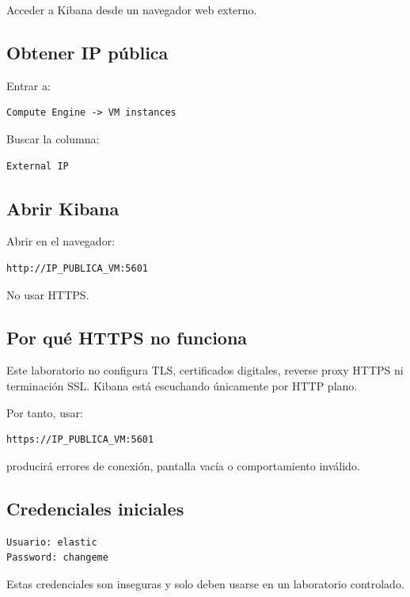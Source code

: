 \documentclass[
  coursetitle={Cómputo Nube y Tecnologías Emergentes},
  coursehours={96},
  coursedate={Verano 2026},
  doctype={Laboratorio},
  otherlangs={english,french},
  authorname={Lázaro},
  authorsurname={Bustio-Martínez},
  authortitle={PhD},
  role={Profesor Investigador},
  email={lbustio@inaoe.mx},
  phone={5559504000},
  ext={7459},
  institution={Instituto Nacional de Astrofísica, Óptica y Electrónica (INAOE)},
  department={Maestría en Ciencias en Tecnologías de Seguridad},
  address={Luis Enrique Erro 1, Sta. Ma. Tonantzintla, San Andrés Cholula, CP 72840, Puebla, México},
  margin={0.5in}
]{../../lbustio_lecture_notes}
\begin{document}
Acceder a Kibana desde un navegador web externo.

\subsection{Obtener IP pública}

Entrar a:

\begin{verbatim}
Compute Engine -> VM instances
\end{verbatim}

Buscar la columna:

\begin{verbatim}
External IP
\end{verbatim}

\subsection{Abrir Kibana}

Abrir en el navegador:

\begin{verbatim}
http://IP_PUBLICA_VM:5601
\end{verbatim}

No usar HTTPS.

\subsection{Por qué HTTPS no funciona}

Este laboratorio no configura TLS, certificados digitales, reverse proxy HTTPS ni terminación SSL. Kibana está escuchando únicamente por HTTP plano.

Por tanto, usar:

\begin{verbatim}
https://IP_PUBLICA_VM:5601
\end{verbatim}

producirá errores de conexión, pantalla vacía o comportamiento inválido.

\subsection{Credenciales iniciales}

\begin{verbatim}
Usuario: elastic
Password: changeme
\end{verbatim}

Estas credenciales son inseguras y solo deben usarse en un laboratorio controlado.
\end{document}
